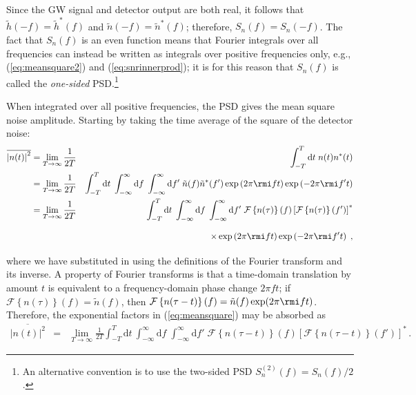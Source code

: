 Since the GW signal and detector output are both real, it follows that $\tilde{h}(-f)=\tilde{h}^{*}(f)$ and $\tilde{n}(-f)=\tilde{n}^{*}(f)$; therefore, $S_{n}(f)=S_{n}(-f)$. The fact that $S_{n}(f)$ is an even function means that Fourier integrals over all frequencies can instead be written as integrals over positive frequencies only, e.g., (\ref{eq:meansquare2}) and (\ref{eq:snrinnerprod}); it is for this reason that $S_{n}(f)$ is called the \emph{one-sided} PSD.\footnote{An alternative convention is to use the two-sided PSD $S^{(2)}_{n}(f) = S_{n}(f)/2$.}

When integrated over all positive frequencies, the PSD gives the mean square noise amplitude. Starting by taking the time average of the square of the detector noise:
\begin{eqnarray}
\overline{\left|n(t)\right|^{2}} &= \lim_{T\rightarrow\infty}\frac{1}{2T} & \int_{-T}^{T}\mathrm{d}t\; n(t)n^{*}(t) \\
 &= \lim_{T\rightarrow\infty}\frac{1}{2T} & \int_{-T}^{T}\mathrm{d}t\; \int_{-\infty}^{\infty}\mathrm{d}f\;\int_{-\infty}^{\infty}\mathrm{d}f'\;\tilde{n}(f)\tilde{n}^{*}(f')\exp\left(2\pi \rmi ft\right)\exp\left(-2\pi \rmi f't\right) \nonumber\\
 &= \lim_{T\rightarrow\infty}\frac{1}{2T} & \int_{-T}^{T}\mathrm{d}t\; \int_{-\infty}^{\infty}\mathrm{d}f\;\int_{-\infty}^{\infty}\mathrm{d}f'\;{\mathcal{F}}\left\{ n(\tau) \right\}(f)\left[{\mathcal{F}}\left\{ n(\tau) \right\}(f')\right]^{*} \nonumber \\*
\label{eq:meansquare} & & \times \vphantom{\int_{-T}^{T}} \exp\left(2\pi \rmi ft\right)\exp\left(-2\pi \rmi f't\right)\;,
\end{eqnarray}
where we have substituted in using the definitions of the Fourier transform and its inverse. A property of Fourier transforms is that a time-domain translation by amount $t$ is equivalent to a frequency-domain phase change $2\pi ft$; if ${\mathcal{F}}\left\{ n(\tau) \right\}(f) = \tilde{n}(f)$, then ${\mathcal{F}}\left\{ n(\tau-t) \right\}(f) = \tilde{n}(f)\exp (2\pi \rmi ft )$. Therefore, the exponential factors in (\ref{eq:meansquare}) may be absorbed as
\begin{eqnarray}
\overline{\left|n(t)\right|^{2}} &=& \lim_{T\rightarrow\infty}\frac{1}{2T}\int_{-T}^{T} \mathrm{d}t\:\int_{-\infty}^{\infty}\mathrm{d}f\;\int_{-\infty}^{\infty}\mathrm{d}f'\;{\mathcal{F}}\left\{ n(\tau-t) \right\}(f)\left[{\mathcal{F}}\left\{ n(\tau-t) \right\}(f')\right]^{*} \, .
\end{eqnarray}
